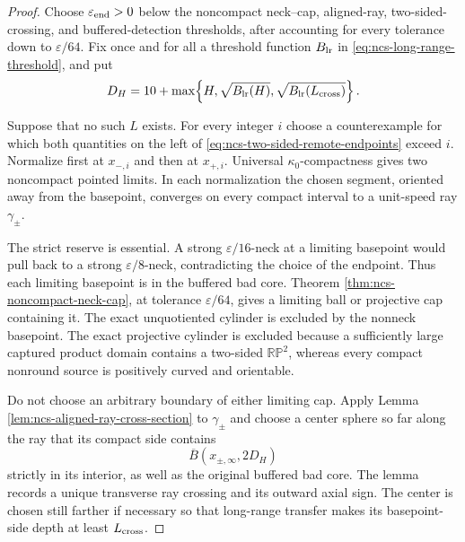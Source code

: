 \documentclass[10pt]{coll-l}
\theoremstyle{definition}
\theoremstyle{remark}
\numberwithin{section}{chapter}
\numberwithin{equation}{chapter}
\begin{document}
\begin{proof}
Choose $\varepsilon_{\rm end}>0$ below the noncompact neck--cap,
aligned-ray, two-sided-crossing, and buffered-detection thresholds, after
accounting for every tolerance down to $\varepsilon/64$.  Fix once and for
all a threshold function $B_{\rm lr}$ in
\eqref{eq:ncs-long-range-threshold}, and put
\begin{equation}
 D_H=10+\max\!\left\{H,\sqrt{B_{\rm lr}(H)},
                    \sqrt{B_{\rm lr}(L_{\rm cross})}\right\}.          \label{eq:ncs-endcap-capture-radius}
\end{equation}

Suppose that no such $L$ exists.  For every integer $i$ choose a
counterexample for which both quantities on the left of
\eqref{eq:ncs-two-sided-remote-endpoints} exceed $i$.  Normalize first at
$x_{-,i}$ and then at $x_{+,i}$.  Universal $\kappa_0$-compactness gives
two noncompact pointed limits.  In each normalization the chosen segment,
oriented away from the basepoint, converges on every compact interval to a
unit-speed ray $\gamma_\pm$.

The strict reserve is essential.  A strong $\varepsilon/16$-neck at a
limiting basepoint would pull back to a strong $\varepsilon/8$-neck,
contradicting the choice of the endpoint.  Thus each limiting basepoint is
in the buffered bad core.  Theorem
\ref{thm:ncs-noncompact-neck-cap}, at tolerance $\varepsilon/64$, gives a
limiting ball or projective cap containing it.  The exact unquotiented
cylinder is excluded by the nonneck basepoint.  The exact projective
cylinder is excluded because a sufficiently large captured product domain
contains a two-sided $\mathbb{RP}^2$, whereas every compact nonround source
is positively curved and orientable.

Do not choose an arbitrary boundary of either limiting cap.  Apply Lemma
\ref{lem:ncs-aligned-ray-cross-section} to $\gamma_\pm$ and choose a
center sphere so far along the ray that its compact side contains
\begin{equation}
             \overline B(x_{\pm,\infty},2D_H)          \label{eq:ncs-limit-endcap-large-ball}
\end{equation}
strictly in its interior, as well as the original buffered bad core.  The
lemma records a unique transverse ray crossing and its outward axial sign.
The center is chosen still farther if necessary so that long-range
transfer makes its basepoint-side depth at least $L_{\rm cross}$.


\end{proof}
\end{document}
